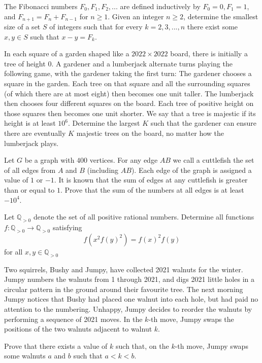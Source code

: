 \documentclass[11pt]{scrartcl}
\begin{document}
\begin{problem}[6978535805224432571]
	The Fibonacci numbers $F_0, F_1, F_2, . . .$ are defined inductively by $F_0=0, F_1=1$, and $F_{n+1}=F_n+F_{n-1}$ for $n \ge 1$. Given an integer $n \ge 2$, determine the smallest size of a set $S$ of integers such that for every $k=2, 3, . . . , n$ there exist some $x, y \in S$ such that $x-y=F_k$.
\end{problem}
\begin{problem}[8799177804774743019]
In each square of a garden shaped like a $2022 \times 2022$ board, there is initially a tree of height $0$. A gardener and a lumberjack alternate turns playing the following game, with the gardener taking the first turn:
The gardener chooses a square in the garden. Each tree on that square and all the surrounding squares (of which there are at most eight) then becomes one unit taller.
The lumberjack then chooses four different squares on the board. Each tree of positive height on those squares then becomes one unit shorter.
We say that a tree is majestic if its height is at least $10^6$. Determine the largest $K$ such that the gardener can ensure there are eventually $K$ majestic trees on the board, no matter how the lumberjack plays.
\end{problem}
\begin{problem}[5347245479409093202]
Let $G$ be a graph with $400$ vertices. For any edge $AB$ we call a cuttlefish the set of all edges from $A$ and $B$ (including $AB$). Each edge of the graph is assigned a value of $1$ or $-1$. It is known that the sum of edges at any cuttlefish is greater than or equal to $1$.
Prove that the sum of the numbers at all edges is at least $-10^4$.
\end{problem}
\begin{problem}[8782897210450267045]
Let $\mathbb{Q}_{>0}$ denote the set of all positive rational numbers. Determine all functions $f:\mathbb{Q}_{>0}\to \mathbb{Q}_{>0}$ satisfying$$f(x^2f(y)^2)=f(x)^2f(y)$$for all $x,y\in\mathbb{Q}_{>0}$
\end{problem}
\begin{problem}[669395675904242]
	Two squirrels, Bushy and Jumpy, have collected 2021 walnuts for the winter. Jumpy numbers the walnuts from 1 through 2021, and digs 2021 little holes in a circular pattern in the ground around their favourite tree. The next morning Jumpy notices that Bushy had placed one walnut into each hole, but had paid no attention to the numbering. Unhappy, Jumpy decides to reorder the walnuts by performing a sequence of 2021 moves. In the $k$-th move, Jumpy swaps the positions of the two walnuts adjacent to walnut $k$.

Prove that there exists a value of $k$ such that, on the $k$-th move, Jumpy swaps some walnuts $a$ and $b$ such that $a<k<b$.
\end{problem}
\end{document}
